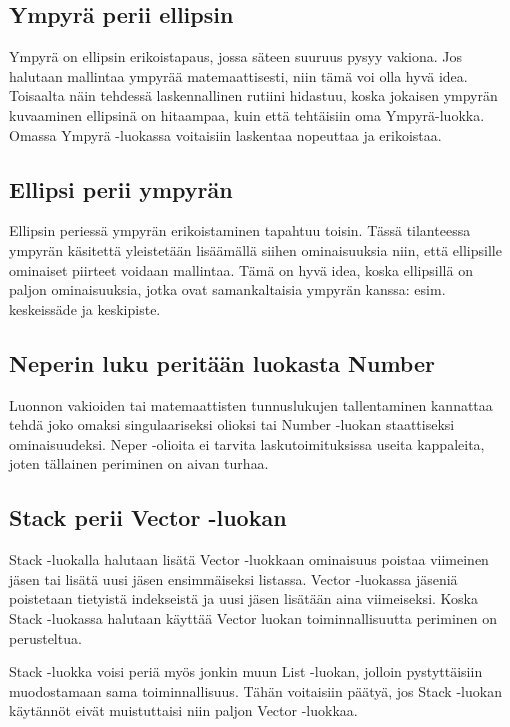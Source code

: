 \subsection{Ympyrä perii ellipsin}

Ympyrä on ellipsin erikoistapaus, jossa säteen suuruus pysyy vakiona. Jos
halutaan mallintaa ympyrää matemaattisesti, niin tämä voi olla hyvä idea.
Toisaalta näin tehdessä laskennallinen rutiini hidastuu, koska jokaisen ympyrän
kuvaaminen ellipsinä on hitaampaa, kuin että tehtäisiin oma Ympyrä-luokka.
Omassa Ympyrä -luokassa voitaisiin laskentaa nopeuttaa ja erikoistaa.

\subsection{Ellipsi perii ympyrän}

Ellipsin periessä ympyrän erikoistaminen tapahtuu toisin. Tässä tilanteessa
ympyrän käsitettä yleistetään lisäämällä siihen ominaisuuksia niin, että
ellipsille ominaiset piirteet voidaan mallintaa. Tämä on hyvä idea, koska
ellipsillä on paljon ominaisuuksia, jotka ovat samankaltaisia ympyrän kanssa:
esim. keskeissäde ja keskipiste.

\subsection{Neperin luku peritään luokasta Number}

Luonnon vakioiden tai matemaattisten tunnuslukujen tallentaminen kannattaa tehdä
joko omaksi singulaariseksi olioksi tai Number -luokan staattiseksi
ominaisuudeksi. Neper -olioita ei tarvita laskutoimituksissa useita kappaleita,
joten tällainen periminen on aivan turhaa.

\subsection{Stack perii Vector -luokan}

Stack -luokalla halutaan lisätä Vector -luokkaan ominaisuus poistaa viimeinen
jäsen tai lisätä uusi jäsen ensimmäiseksi listassa. Vector -luokassa jäseniä
poistetaan tietyistä indekseistä ja uusi jäsen lisätään aina viimeiseksi. Koska
Stack -luokassa halutaan käyttää Vector luokan toiminnallisuutta periminen on
perusteltua. 

Stack -luokka voisi periä myös jonkin muun List -luokan, jolloin pystyttäisiin
muodostamaan sama toiminnallisuus. Tähän voitaisiin päätyä, jos Stack -luokan
käytännöt eivät muistuttaisi niin paljon Vector -luokkaa.
